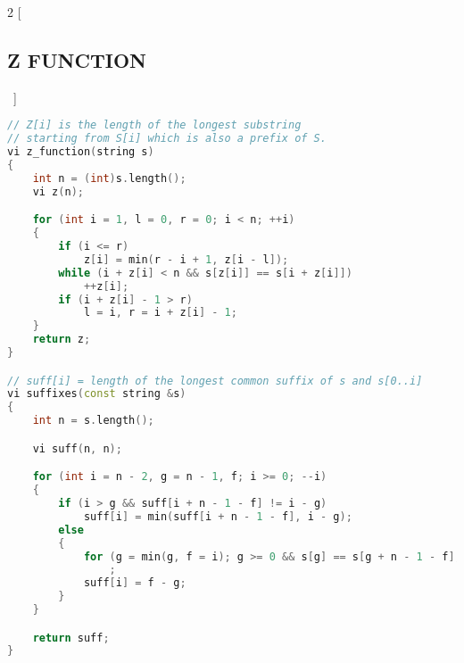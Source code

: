 \documentclass[leter]{amsart}
\begin{document}
\begin{multicols}{2}
[\subsection{Z FUNCTION}\ ]
\begin{lstlisting}[language=C++]
// Z[i] is the length of the longest substring
// starting from S[i] which is also a prefix of S.
vi z_function(string s)
{
    int n = (int)s.length();
    vi z(n);

    for (int i = 1, l = 0, r = 0; i < n; ++i)
    {
        if (i <= r)
            z[i] = min(r - i + 1, z[i - l]);
        while (i + z[i] < n && s[z[i]] == s[i + z[i]])
            ++z[i];
        if (i + z[i] - 1 > r)
            l = i, r = i + z[i] - 1;
    }
    return z;
}

// suff[i] = length of the longest common suffix of s and s[0..i]
vi suffixes(const string &s)
{
    int n = s.length();

    vi suff(n, n);

    for (int i = n - 2, g = n - 1, f; i >= 0; --i)
    {
        if (i > g && suff[i + n - 1 - f] != i - g)
            suff[i] = min(suff[i + n - 1 - f], i - g);
        else
        {
            for (g = min(g, f = i); g >= 0 && s[g] == s[g + n - 1 - f]; --g)
                ;
            suff[i] = f - g;
        }
    }

    return suff;
}

\end{lstlisting}
\end{multicols}
\end{document}
